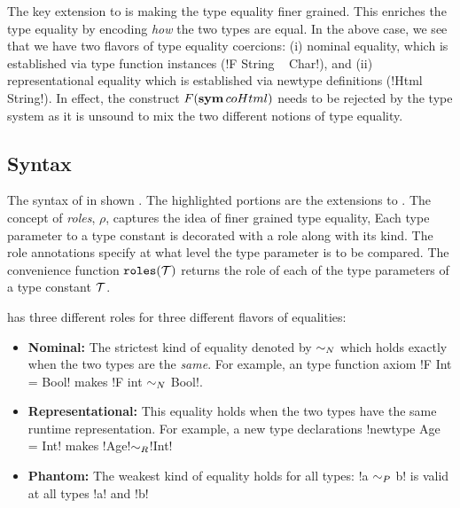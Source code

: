 \documentclass[screen,nonacm,manuscript,review]{acmart} %
\begin{document}
The key extension to \SFC
is making the type equality finer grained.
This enriches the type equality by encoding
\emph{how} the two types are equal. In the above case, we see that
we have two flavors of type equality coercions:
(i) nominal equality, which is established
via type function instances (!F String ~ Char!), and
(ii) representational equality which is established
via newtype definitions (!Html ~ String!).
In effect, the construct $F(\textbf{sym}\,{coHtml})$ needs to be rejected by the
type system as it is unsound to mix the
two different notions of type equality.

\subsection{Syntax}\label{sec:sfr-syntax}
The syntax of \SFR\cite{breitner_safe_2014, weirich_generative_2011} in shown .
The highlighted portions are the extensions to \SFC.
The concept of \emph{roles}, $\rho$, captures the idea of finer grained type equality,
Each type parameter to a type constant is decorated with a role along
with its kind. The role annotations
specify at what level the type parameter is to be compared.
The convenience function $\texttt{roles}(\mathcal{T})$ returns the role of
each of the type parameters of a type constant $\mathcal{T}$.

\SFR has three different roles for three different flavors of equalities:
\begin{itemize}
\item\textbf{Nominal:} The strictest kind of equality denoted by
  $\mathrel{\sim_N}$ which holds exactly when the two types are the \emph{same}.
  For example, an type function axiom !F Int = Bool!
  makes !F int $\mathrel{\sim_N}$ Bool!.
\item\textbf{Representational:} This equality holds when the two types
  have the same runtime representation.
  For example, a new type declarations !newtype Age = Int! makes
  !Age!$\mathrel{\sim_R}$!Int!
\item\textbf{Phantom:} The weakest kind of equality holds for all
  types: !a $\mathrel{\sim_P}$ b! is valid at all types !a! and !b!
\end{itemize}
\end{document}
